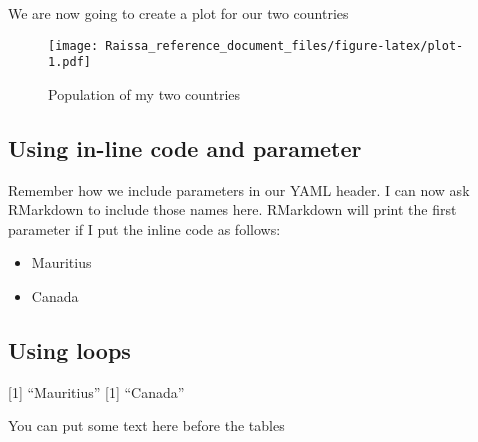 \documentclass[]{article}
\providecommand{\tightlist}{%
  \setlength{\itemsep}{0pt}\setlength{\parskip}{0pt}}
\begin{document}
We are now going to create a plot for our two countries

\begin{figure}
\centering
\texttt{[image: Raissa\_reference\_document\_files/figure-latex/plot-1.pdf]}
\caption{Population of my two countries}
\end{figure}

\hypertarget{using-in-line-code-and-parameter}{%
\subsection{Using in-line code and
parameter}\label{using-in-line-code-and-parameter}}

Remember how we include parameters in our YAML header. I can now ask
RMarkdown to include those names here. RMarkdown will print the first
parameter if I put the inline code as follows:

\begin{itemize}
\tightlist
\item
  Mauritius
\item
  Canada
\end{itemize}

\hypertarget{using-loops}{%
\subsection{Using loops}\label{using-loops}}

{[}1{]} ``Mauritius'' {[}1{]} ``Canada''

You can put some text here before the tables
\end{document}
